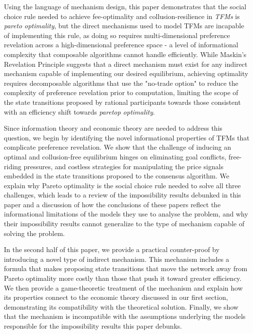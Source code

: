 \documentclass[sigconf,anonymous]{aamas}
\begin{document}
Using the language of mechanism design, this paper demonstrates that the social choice rule needed to achieve fee-optimality and collusion-resilience in \textit{TFMs} is \textit{pareto optimality}, but the direct mechanisms used to model TFMs are incapable of implementing this rule, as doing so requires multi-dimensional preference revelation across a high-dimensional preference space - a level of informational complexity that composable algorithms cannot handle efficiently. While Maskin's Revelation Principle suggests that a direct mechanism must exist for any indirect mechanism capable of implementing our desired equilibrium, achieving optimality requires decomposable algorithms that use the "no-trade option" to reduce the complexity of preference revelation prior to computation, limiting the scope of the state transitions proposed by rational participants towards those consistent with an efficiency shift towards \textit{paretop optimality}.

Since information theory and economic theory are needed to address this question, we begin by identifying the novel informational properties of TFMs that complicate preference revelation. We show that the challenge of inducing an optimal and collusion-free equilibrium hinges on eliminating goal conflicts, free-riding pressures, and costless strategies for manipulating the price signals embedded in the state transitions proposed to the consensus algorithm. We explain why Pareto optimality is the social choice rule needed to solve all three challenges, which leads to a review of the impossibility results debunked in this paper and a discussion of how the conclusions of these papers reflect the informational limitations of the models they use to analyse the problem, and why their impossibility results cannot generalize to the type of mechanism capable of solving the problem.

In the second half of this paper, we provide a practical counter-proof by introducing a novel type of indirect mechanism. This mechanism includes a formula that makes proposing state transitions that move the network away from Pareto optimality more costly than those that push it toward greater efficiency. We then provide a game-theoretic treatment of the mechanism and explain how its properties connect to the economic theory discussed in our first section, demonstrating its compatibility with the theoretical solution. Finally, we show that the mechanism is incompatible with the assumptions underlying the models responsible for the impossibility results this paper debunks.
\end{document}

